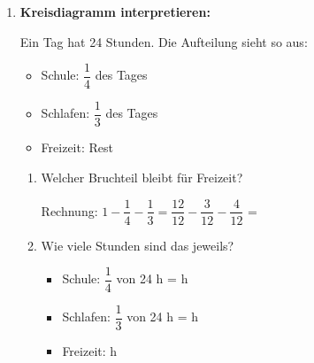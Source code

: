 \begin{enumerate}[label=\arabic*.]
    \vspace{0.5cm}

    \item \textbf{Kreisdiagramm interpretieren:} 

    Ein Tag hat 24 Stunden. Die Aufteilung sieht so aus:
    \begin{itemize}
        \item Schule: $\dfrac{1}{4}$ des Tages
        \item Schlafen: $\dfrac{1}{3}$ des Tages
        \item Freizeit: Rest
    \end{itemize}

    \begin{enumerate}[label=\alph*)]
        \item Welcher Bruchteil bleibt für Freizeit? 

        Rechnung: $1 - \dfrac{1}{4} - \dfrac{1}{3} = \dfrac{12}{12} - \dfrac{3}{12} - \dfrac{4}{12}$ = \underline{\hspace{3cm}}

        \item Wie viele Stunden sind das jeweils?
        \begin{itemize}
            \item Schule: $\dfrac{1}{4}$ von 24 h = \underline{\hspace{2cm}} h
            \item Schlafen: $\dfrac{1}{3}$ von 24 h = \underline{\hspace{2cm}} h
            \item Freizeit: \underline{\hspace{2cm}} h
        \end{itemize}
    \end{enumerate}
\end{enumerate}
